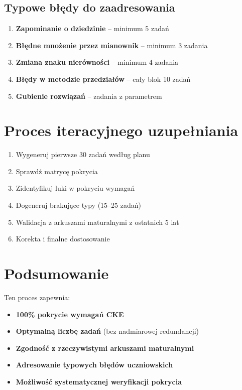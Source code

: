 \documentclass[12pt,a4paper]{article}
\begin{document}
\subsection{Typowe błędy do zaadresowania}
\begin{enumerate}
    \item \textbf{Zapominanie o dziedzinie} -- minimum 5 zadań
    \item \textbf{Błędne mnożenie przez mianownik} -- minimum 3 zadania
    \item \textbf{Zmiana znaku nierówności} -- minimum 4 zadania
    \item \textbf{Błędy w metodzie przedziałów} -- cały blok 10 zadań
    \item \textbf{Gubienie rozwiązań} -- zadania z parametrem
\end{enumerate}

\section{Proces iteracyjnego uzupełniania}

\begin{enumerate}
    \item Wygeneruj pierwsze 30 zadań według planu
    \item Sprawdź matrycę pokrycia
    \item Zidentyfikuj luki w pokryciu wymagań
    \item Dogeneruj brakujące typy (15--25 zadań)
    \item Walidacja z arkuszami maturalnymi z ostatnich 5 lat
    \item Korekta i finalne dostosowanie
\end{enumerate}

\section{Podsumowanie}

Ten proces zapewnia:
\begin{itemize}
    \item \textbf{100\% pokrycie wymagań CKE}
    \item \textbf{Optymalną liczbę zadań} (bez nadmiarowej redundancji)
    \item \textbf{Zgodność z rzeczywistymi arkuszami maturalnymi}
    \item \textbf{Adresowanie typowych błędów uczniowskich}
    \item \textbf{Możliwość systematycznej weryfikacji pokrycia}
\end{itemize}
\end{document}
